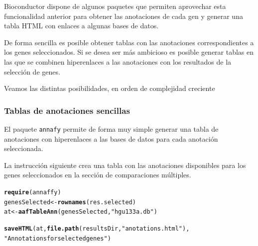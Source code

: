 \documentclass[a4paper]{article}\usepackage[]{graphicx}\usepackage[]{color}
\makeatletter
\newcommand{\hlstr}[1]{\textcolor[rgb]{0.192,0.494,0.8}{#1}}%
\newcommand{\hlstd}[1]{\textcolor[rgb]{0.345,0.345,0.345}{#1}}%
\newcommand{\hlkwb}[1]{\textcolor[rgb]{0.69,0.353,0.396}{#1}}%
\newcommand{\hlkwd}[1]{\textcolor[rgb]{0.737,0.353,0.396}{\textbf{#1}}}%
\newenvironment{kframe}{%
 \def\at@end@of@kframe{}%
 \ifinner\ifhmode%
  \def\at@end@of@kframe{\end{minipage}}%
  \begin{minipage}{\columnwidth}%
 \fi\fi%
 \def\FrameCommand##1{\hskip\@totalleftmargin \hskip-\fboxsep
 \colorbox{shadecolor}{##1}\hskip-\fboxsep
     \hskip-\linewidth \hskip-\@totalleftmargin \hskip\columnwidth}%
 \MakeFramed {\advance\hsize-\width
   \@totalleftmargin\z@ \linewidth\hsize
   \@setminipage}}%
 {\par\unskip\endMakeFramed%
 \at@end@of@kframe}
\newenvironment{knitrout}{}{} %
\makeatother
\begin{document}
Bioconductor dispone de algunos paquetes que permiten aprovechar esta funcionalidad anterior para obtener las anotaciones de cada gen y generar una tabla HTML con enlaces a algunas bases de datos.

De forma sencilla es posible obtener tablas con las anotaciones correspondientes a los genes seleccionados. Si se desea ser más ambicioso es posible generar tablas en las que se combinen hiperenlaces a las anotaciones con los resultados de la selección de genes.

Veamos las distintas posibilidades, en orden de complejidad creciente

\subsubsection{Tablas de anotaciones sencillas}

El paquete \texttt{annafy} permite de forma muy simple generar una tabla de anotaciones con hiperenlaces a las bases de datos para cada anotación seleccionada.

La instrucción siguiente crea una tabla con las anotaciones disponibles para los genes seleccionados en la sección de comparaciones múltiples.

\begin{knitrout}
\color{fgcolor}\begin{kframe}
\begin{alltt}
\hlkwd{require}\hlstd{(annaffy)}
\hlstd{genesSelected} \hlkwb{<-} \hlkwd{rownames}\hlstd{(res.selected)}
\hlstd{at} \hlkwb{<-} \hlkwd{aafTableAnn}\hlstd{(genesSelected,} \hlstr{"hgu133a.db"}\hlstd{)}
\end{alltt}


{\ttfamily\noindent\color{warningcolor}{\#\# Warning in result\_fetch(res@ptr, n = n): SQL statements must be issued with dbExecute() or dbSendStatement() instead of dbGetQuery() or dbSendQuery().}}

{\ttfamily\noindent\color{warningcolor}{\#\# Warning in result\_fetch(res@ptr, n = n): SQL statements must be issued with dbExecute() or dbSendStatement() instead of dbGetQuery() or dbSendQuery().}}\begin{alltt}
\hlkwd{saveHTML} \hlstd{(at,} \hlkwd{file.path}\hlstd{(resultsDir,} \hlstr{"anotations.html"}\hlstd{),}
          \hlstr{"Annotations for selected genes"}\hlstd{)}
\end{alltt}
\end{kframe}
\end{knitrout}
\end{document}
